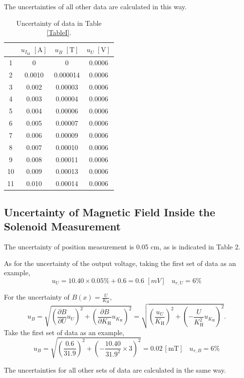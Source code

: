 \documentclass{article}
\begin{document}
The uncertainties of all other data are calculated in this way.

\begin{table}[H]
\centering
\begin{tabular}{cccc}
\toprule
& $u_{I_\text{M}}\,\,[\text{A}]$ & $u_B\,\,[\text{T}]$ & $u_U\,\,[\text{V}]$\\
\midrule
    1     & 0 & 0   & 0.0006 \\
    2     & 0.0010 & 0.000014  & 0.0006 \\
    3     & 0.002 & 0.00003  & 0.0006 \\
    4     & 0.003 & 0.00004  & 0.0006 \\
    5     & 0.004 & 0.00006  & 0.0006 \\
    6     & 0.005 & 0.00007  & 0.0006 \\
    7     & 0.006 & 0.00009  & 0.0006 \\
    8     & 0.007 & 0.00010  & 0.0006 \\
    9     & 0.008 & 0.00011  & 0.0006 \\
    10    & 0.009 & 0.00013  & 0.0006 \\
    11    & 0.010  & 0.00014  & 0.0006 \\
\bottomrule
\end{tabular}
\caption{Uncertainty of data in Table \ref{TableI}.}\label{TableUncI}
\end{table}

	\subsection{Uncertainty of Magnetic Field Inside the Solenoid Measurement}

The uncertainty of position measurement is 0.05 cm, as is indicated in Table 2.

As for the uncertainty of the output voltage, taking the first set of data as an example,
$$u_U = 10.40 \times 0.05\% + 0.6 = 0.6\,\,[mV]~~~~u_{r,U} = 6\%$$

For the uncertainty of $\displaystyle B(x) =\frac{U}{K_\text{H}}$,
$$ u_B = \sqrt{(\frac{\partial B}{\partial U}u_U)^2 + (\frac{\partial B}{\partial K_\text{H}}u_{K_\text{H}})^2} = \sqrt{(\frac{u_U}{K_\text{H}})^2 + (-\frac{U}{K_\text{H}^2}u_{K_\text{H}})^2}. $$
Take the first set of data as an example,
$$  u_B = \sqrt{(\frac{0.6}{31.9})^2 + (-\frac{10.40}{31.9^2}\times 3)^2} = 0.02\,[\text{mT}]~~~~u_{r,B} = 6\%$$

The uncertainties for all other sets of data are calculated in the same way.
\end{document}
